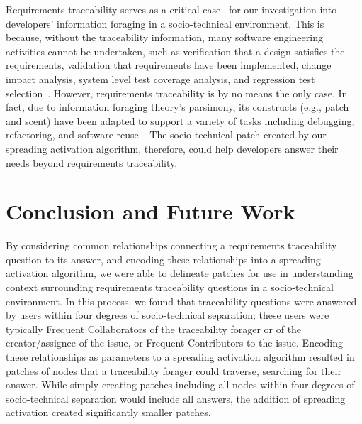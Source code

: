 \documentclass[conference]{IEEEtran}
\begin{document}
Requirements traceability serves as a critical case~\cite{yin03} for our investigation into developers' information foraging in a socio-technical environment. This is because, without the traceability information, many software engineering activities cannot be undertaken, such as verification that a design satisfies the requirements, validation that requirements have been implemented, change impact analysis, system level test coverage analysis, and regression test selection~\cite{Hayes-TSE06}. However, requirements traceability is by no means the only case. In fact, due to information foraging theory's parsimony, its constructs (e.g., patch and scent) have been adapted to support a variety of tasks including debugging, refactoring, and software reuse~\cite{Fleming-TOSEM13, Ragavan-CHI16, Ragavan-CHI17}. The socio-technical patch created by our spreading activation algorithm, therefore, could help developers answer their needs beyond requirements traceability.




\section{Conclusion and Future Work}
By considering common relationships connecting a requirements traceability question to its answer, and encoding these relationships into a spreading activation algorithm, we were able to delineate patches for use in understanding context surrounding requirements traceability questions in a socio-technical environment. In this process, we found that traceability questions were answered by users within four degrees of socio-technical separation; these users were typically Frequent Collaborators of the traceability forager or of the creator/assignee of the issue, or Frequent Contributors to the issue. Encoding these relationships as parameters to a spreading activation algorithm resulted in patches of nodes that a traceability forager could traverse, searching for their answer. While simply creating patches including all nodes within four degrees of socio-technical separation would include all answers, the addition of spreading activation created significantly smaller patches.
\end{document}
